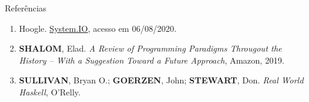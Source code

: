 \begin{frame}[fragile]{Referências}

    \begin{enumerate}
        \item Hoogle. \href{https://hackage.haskell.org/package/base-4.14.0.0/docs/System-IO.html#g:20}{
            System.IO}, acesso em 06/08/2020.
 
        \item \textbf{SHALOM}, Elad. \textit{A Review of Programming Paradigms Througout the 
            History -- With a Suggestion Toward a Future Approach}, Amazon, 2019.

        \item \textbf{SULLIVAN}, Bryan O.; \textbf{GOERZEN}, John; \textbf{STEWART}, Don. 
            \textit{Real World Haskell}, O'Relly.

    \end{enumerate}

\end{frame}
